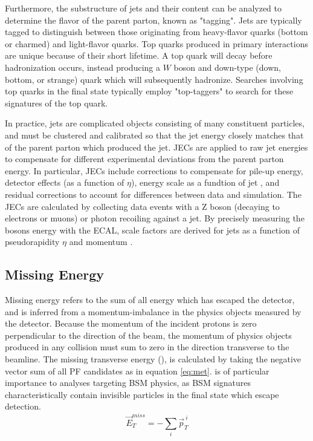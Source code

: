 Furthermore, the substructure of jets and their content can be analyzed to determine the flavor of the parent parton, known as "tagging". Jets are typically tagged to distinguish between those originating from heavy-flavor quarks (bottom or charmed) and light-flavor quarks. Top quarks produced in primary interactions are unique because of their short lifetime. A top quark will decay before hadronization occurs, instead producing a $W$ boson and down-type (down, bottom, or strange) quark which will subsequently hadronize. Searches involving top quarks in the final state typically employ "top-taggers" to search for these signatures of the top quark.

In practice, jets are complicated objects consisting of many constituent particles, and must be clustered and calibrated so that the jet energy closely matches that
of the parent parton which produced the jet. JECs are applied to raw jet energies to compensate for different experimental deviations from the parent parton energy. In particular, JECs include corrections to compensate for pile-up energy, detector effects (as a function of $\eta$), energy scale as a fundtion of jet \pt, and residual corrections to account for differences between data and simulation. The JECs are calculated by collecting data events with a Z boson (decaying to electrons or muons) or photon recoiling against a jet. By precisely measuring the bosons energy with the ECAL, scale factors are derived for jets as a function of pseudorapidity $\eta$ and momentum \pt. 

\subsection{Missing Energy}
\label{subsec:met}
Missing energy refers to the sum of all energy which has escaped the detector, and is inferred from a momentum-imbalance in the physics objects measured by the detector. Because the momentum of the incident protons is zero perpendicular to the direction of the beam, the momentum of physics objects produced in any collision must sum to zero in the direction transverse to the beamline. The missing transverse energy (\MET), is calculated by taking the negative vector sum of all PF candidates as in equation \ref{eq:met}. \MET is of particular importance to analyses targeting BSM physics, as BSM signatures characteristically contain invisible particles in the final state which escape detection.
\begin{equation}
	\label{eq:met}
	\vec{E}_T^{miss}=-\sum_i^{} \vec{p}_T^{\: i}
\end{equation}

